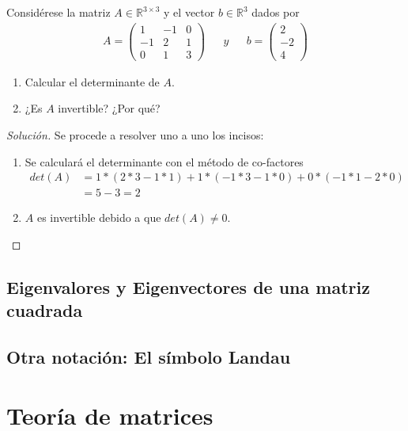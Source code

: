 \documentclass[12pt]{book}
\newcommand{\R}{\mathbb{R}}
\newenvironment{solucion}
  {\renewcommand\qedsymbol{$\square$}\begin{proof}[Solución]}
  {\end{proof}}
\begin{document}
\eje Considérese la matriz $A\in\R^{3\times3}$ y el vector $b\in\R^3$ dados por
\begin{align*}
    A=\begin{pmatrix}
    1 & -1 & 0\\
    -1 & 2 & 1\\
    0 & 1 & 3
    \end{pmatrix} && y && b=\begin{pmatrix}
    2\\
    -2\\
    4
    \end{pmatrix}
\end{align*}
\renewcommand{\labelenumi}{(\alph{enumi})}
\begin{enumerate}
    \item Calcular el determinante de $A$.
    \item ¿Es $A$ invertible? ¿Por qué?
\end{enumerate}
\begin{solucion}
    Se procede a resolver uno a uno los incisos:
    \renewcommand{\labelenumi}{(\alph{enumi})}
    \begin{enumerate}
        \item Se calculará el determinante con el método de co-factores
            \begin{align*}
                det(A)&=1*(2*3-1*1)+1*(-1*3-1*0)+0*(-1*1-2*0)\\
                &=5-3=2
            \end{align*}
        \item $A$ es invertible debido a que $det(A)\neq0$.
\end{enumerate}
\end{solucion}


\section{Eigenvalores y Eigenvectores de una matriz cuadrada}
\section{Otra notación: El símbolo Landau}


\chapter{Teoría de matrices}
\end{document}
